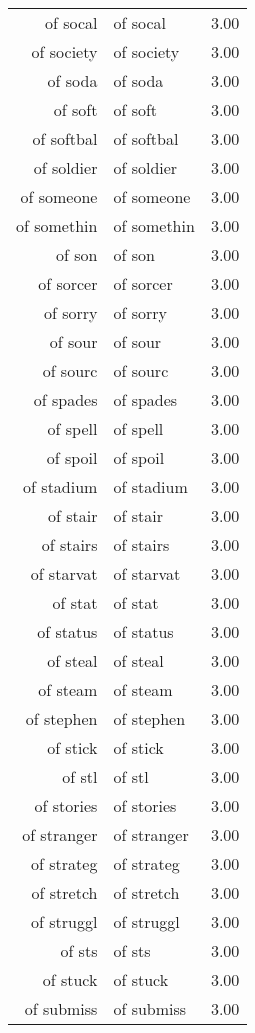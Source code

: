 \begin{table}[ht]
\begin{tabular}{rlr}
  of socal & of socal & 3.00 \\ 
  of society & of society & 3.00 \\ 
  of soda & of soda & 3.00 \\ 
  of soft & of soft & 3.00 \\ 
  of softbal & of softbal & 3.00 \\ 
  of soldier & of soldier & 3.00 \\ 
  of someone & of someone & 3.00 \\ 
  of somethin & of somethin & 3.00 \\ 
  of son & of son & 3.00 \\ 
  of sorcer & of sorcer & 3.00 \\ 
  of sorry & of sorry & 3.00 \\ 
  of sour & of sour & 3.00 \\ 
  of sourc & of sourc & 3.00 \\ 
  of spades & of spades & 3.00 \\ 
  of spell & of spell & 3.00 \\ 
  of spoil & of spoil & 3.00 \\ 
  of stadium & of stadium & 3.00 \\ 
  of stair & of stair & 3.00 \\ 
  of stairs & of stairs & 3.00 \\ 
  of starvat & of starvat & 3.00 \\ 
  of stat & of stat & 3.00 \\ 
  of status & of status & 3.00 \\ 
  of steal & of steal & 3.00 \\ 
  of steam & of steam & 3.00 \\ 
  of stephen & of stephen & 3.00 \\ 
  of stick & of stick & 3.00 \\ 
  of stl & of stl & 3.00 \\ 
  of stories & of stories & 3.00 \\ 
  of stranger & of stranger & 3.00 \\ 
  of strateg & of strateg & 3.00 \\ 
  of stretch & of stretch & 3.00 \\ 
  of struggl & of struggl & 3.00 \\ 
  of sts & of sts & 3.00 \\ 
  of stuck & of stuck & 3.00 \\ 
  of submiss & of submiss & 3.00 \\ 

\end{tabular}
\end{table}
